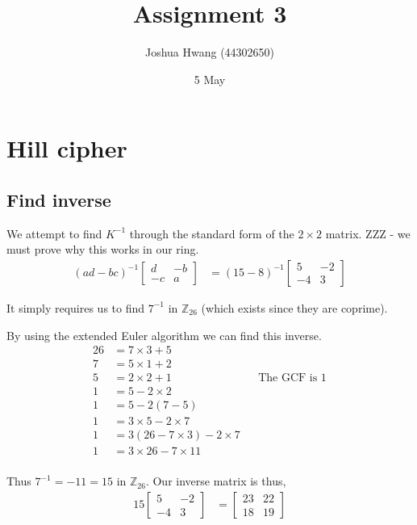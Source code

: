\documentclass{article}
\title{Assignment 3}
\author{Joshua Hwang (44302650)}
\date{5 May}
\begin{document}
\maketitle

\section{Hill cipher}
\subsection{Find inverse}
We attempt to find $K^{-1}$ through the standard form of the $2\times2$
matrix. ZZZ - we must prove why this works in our ring.
\begin{align*}
    (ad-bc)^{-1}
    \begin{bmatrix}
        d & -b \\
        -c & a
    \end{bmatrix}
    &=
    (15-8)^{-1}
    \begin{bmatrix}
        5 & -2 \\
        -4 & 3
    \end{bmatrix}
\end{align*}

It simply requires us to find $7^{-1}$ in $\mathbb{Z}_{26}$ (which exists since
they are coprime).

By using the extended Euler algorithm we can find this inverse.
\begin{align*}
    26 &= 7\times3 + 5 \\
    7 &= 5\times1 + 2 \\
    5 &= 2\times2 + 1 && \text{The GCF is 1} \\
    1 &= 5 - 2\times2 \\
    1 &= 5 - 2(7-5) \\
    1 &= 3\times5 - 2\times7 \\
    1 &= 3(26 - 7\times3) - 2\times7 \\
    1 &= 3\times26 - 7\times11 \\
\end{align*}

Thus $7^{-1} = -11 = 15$ in $\mathbb{Z}_{26}$. Our inverse matrix is thus,
\begin{align*}
    15
    \begin{bmatrix}
        5 & -2 \\
        -4 & 3
    \end{bmatrix}
    &=
    \begin{bmatrix}
        23 & 22 \\
        18 & 19
    \end{bmatrix}
\end{align*}
\end{document}
